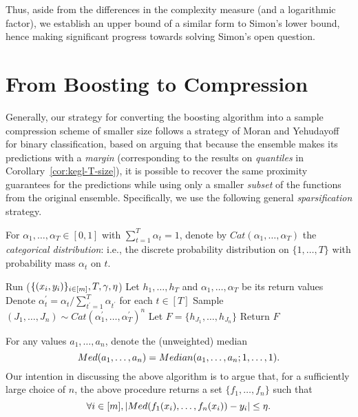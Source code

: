 \documentclass[12pt,a4paper,oneside,onecolumn]{book}
\begin{document}
Thus, aside from the differences in the complexity measure (and a logarithmic factor), 
we establish an upper bound of a similar form to Simon's lower bound, hence making significant progress towards solving Simon's open question.

    

\section{From Boosting to Compression}
    
\label{subsec:boosting-to-compression}

Generally, our strategy for converting the boosting algorithm  into a sample compression scheme of smaller size 
follows a strategy of Moran and Yehudayoff for binary classification, based on arguing that because the ensemble makes its predictions 
with a \emph{margin} (corresponding to the results on \emph{quantiles} in Corollary~\ref{cor:kegl-T-size}), 
it is possible to recover the same proximity guarantees for the predictions while using only a smaller \emph{subset} of the 
functions from the original ensemble.  Specifically, we use the following general \emph{sparsification} strategy.

For $\alpha_{1},\ldots,\alpha_{T} \in [0,1]$ with $\sum_{t=1}^{T} \alpha_{t} = 1$, 
denote by $Cat( \alpha_{1},\ldots,\alpha_{T} )$ the \emph{categorical distribution}: 
i.e., the discrete probability distribution on $\{1,\ldots,T\}$ with probability mass $\alpha_{t}$ on $t$.

\begin{algorithm}[ht]
  \caption{($\{(x_i,y_i)\}_{i\in[m]},\adv,T,n$)}
  \begin{algorithmic}[1]
    \State Run ($\{(x_i,y_i)\}_{i\in[m]},T,\gamma,\eta$)
    \State Let $h_{1},\ldots,h_{T}$ and $\alpha_{1},\ldots,\alpha_{T}$ be its return values 
    \State Denote $\alpha_{t}^{\prime} = \alpha_{t} / \sum_{t^{\prime}=1}^{T} \alpha_{t^{\prime}}$ for each $t\in[T]$
    \Repeat
      \State Sample $(J_{1},\ldots,J_{n}) \sim Cat( \alpha_{1}^{\prime},\ldots,\alpha_{T}^{\prime} )^{n}$ 
      \State Let $F = \{ h_{J_{1}},\ldots, h_{J_{n}} \}$
      \State Return $F$
  \end{algorithmic}
\end{algorithm}

For any values $a_{1},\ldots,a_{n}$, denote the (unweighted) median 
\begin{equation*}
Med(a_{1},\ldots,a_{n}) = Median(a_{1},\ldots,a_{n}; 1,\ldots,1).
\end{equation*}
Our intention in discussing the above algorithm is to argue that, for a sufficiently large choice of $n$, 
the above procedure returns a set $\{f_{1},\ldots,f_{n}\}$ such that 
\[
\forall i\in[m], | Med(f_{1}(x_{i}),\ldots,f_{n}(x_{i})) - y_{i} | \leq \eta.
\]
\end{document}
